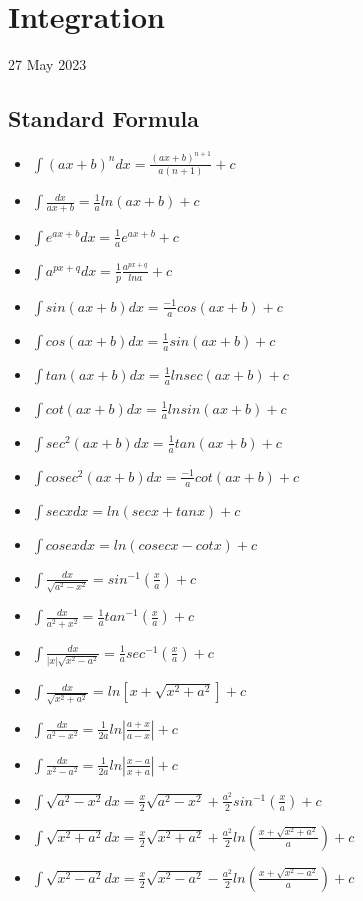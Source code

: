 \documentclass[12pt]{article}
\begin{document}
\section{Integration}
27 May 2023
\subsection{Standard Formula}
\begin{itemize}
\item $\int(ax+b)^n dx=\frac{(ax+b)^{n+1}}{a(n+1)}+c$
\item $\int \frac{dx}{ax+b}=\frac{1}{a} ln(ax+b)  +c$
\item $\int e^{ax+b}dx= \frac{1}{a} e^{ax+b}+c$
\item $\int a^{px+q}dx=\frac{1}{p}\frac{a^{px+q}}{lna} +c$
\item $\int sin(ax+b)dx=\frac{-1}{a}cos(ax+b)+c$
\item $\int cos(ax+b)dx=\frac{1}{a}sin(ax+b)+c$
\item $\int tan(ax+b)dx=\frac{1}{a}lnsec(ax+b)+c$
\item $\int cot(ax+b)dx=\frac{1}{a}lnsin(ax+b)+c$
\item $\int sec^2(ax+b)dx=\frac{1}{a}tan(ax+b)+c$
\item $\int cosec^2(ax+b)dx=\frac{-1}{a}cot(ax+b)+c$
\item $\int secxdx=ln(secx+tanx)+c$
\item $\int cosexdx=ln(cosecx-cotx)+c$
\item $\int \frac{dx}{\sqrt{a^2-x^2}}=sin^{-1}(\frac{x}{a})+c$
\item $\int \frac{dx}{a^2+x^2}=\frac{1}{a}tan^{-1}(\frac{x}{a})+c$
\item $\int \frac{dx}{|x|\sqrt{x^2-a^2}}=\frac{1}{a}sec^{-1}(\frac{x}{a})+c$
\item $\int \frac{dx}{\sqrt{x^2+a^2}}=ln[{x+\sqrt{x^2+a^2}}]+c$
\item $\int \frac{dx}{a^2-x^2}=\frac{1}{2a}ln|\frac{a+x}{a-x}|+c$
\item $\int \frac{dx}{x^2-a^2}=\frac{1}{2a}ln|\frac{x-a}{x+a}|+c$
\item $\int \sqrt{a^2-x^2}dx=\frac{x}{2}\sqrt{a^2-x^2}+\frac{a^2}{2}sin^{-1}(\frac{x}{a})+c$
\item $\int \sqrt{x^2+a^2}dx=\frac{x}{2}\sqrt{x^2+a^2}+\frac{a^2}{2}ln(\frac{x+\sqrt{x^2+a^2}}{a})+c$
\item $\int \sqrt{x^2-a^2}dx=\frac{x}{2}\sqrt{x^2-a^2}-\frac{a^2}{2}ln(\frac{x+\sqrt{x^2-a^2}}{a})+c$
\end{itemize}
\end{document}
